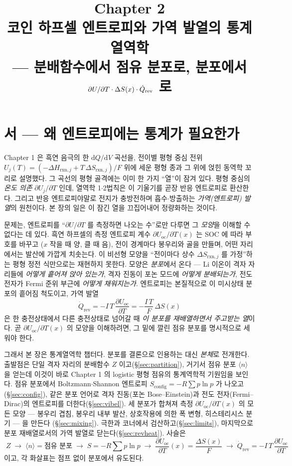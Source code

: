 \documentclass[11pt,a4paper]{article}
\title{\textbf{\LARGE Chapter 2}\\[0.35em]\Large 코인 하프셀 엔트로피와 가역 발열의 통계열역학\\[0.2em]\large — 분배함수에서 점유 분포로, 분포에서 $\partial U/\partial T\cdot\Delta S(x)\cdot\dot Q_\rev$ 로}
\author{}\date{}
\newcommand{\dd}{\mathrm{d}}
\newcommand{\rxn}{\mathrm{rxn}}
\newcommand{\rev}{\mathrm{rev}}
\newcommand{\oc}{\mathrm{oc}}
\newcommand{\config}{\mathrm{config}}
\newcommand{\avg}[1]{\langle #1\rangle}
\begin{document}
\maketitle

\section*{서 — 왜 엔트로피에는 통계가 필요한가}
Chapter 1 은 흑연 음극의 한 $\dd Q/\dd V$ 곡선을, 전이별 평형 중심 전위
$U_j(T)=(-\Delta H_{\rxn,j}+T\,\Delta S_{\rxn,j})/F$ 위에 세운 평형 종과 그 위에 얹힌 동역학 꼬리로
설명했다. 그 곡선의 평형 골격에는 이미 한 가지 ``열''이 잠겨 있다. 평형 중심의 \emph{온도 의존}
$\partial U_j/\partial T$ 인데, 열역학 1$\cdot$2법칙은 이 기울기를 곧장 반응 엔트로피로 환산한다. 그리고
반응 엔트로피야말로 전지가 충방전하며 흡수$\cdot$방출하는 \emph{가역(엔트로피) 발열}의 원천이다. 본 장의
일은 이 잠긴 열을 끄집어내어 정량화하는 것이다.

문제는, 엔트로피를 ``$\partial U/\partial T$ 를 측정하면 나오는 수''로만 다루면 그 \emph{모양}을 이해할 수
없다는 데 있다. 흑연 하프셀의 측정 엔트로피 계수 $\partial U_\oc/\partial T(x)$ 는 SOC 에 따라 부호를 바꾸고
($x$ 작을 때 양, 클 때 음), 전이 경계마다 봉우리와 골을 만들며, 어떤 자리에서는 발산에 가깝게 치솟는다. 이
비선형 모양을 ``전이마다 상수 $\Delta S_{\rxn,j}$ 를 가정''하는 평형 정전 식만으로는 재현하지 못한다. 모양은
\emph{분포}에서 온다 — Li 이온이 격자 자리들에 \emph{어떻게 흩어져 앉아 있는가}, 격자 진동이 포논 모드에
\emph{어떻게 분배되는가}, 전도 전자가 Fermi 준위 부근에 \emph{어떻게 채워지는가}. 엔트로피는 본질적으로
이 미시상태 분포의 흩어짐 척도이고, 가역 발열
\[
\dot Q_\rev=-I\,T\,\frac{\partial U_\oc}{\partial T}=-\frac{I\,T}{F}\,\Delta S(x)
\]
은 한 충전상태에서 다른 충전상태로 넘어갈 때 \emph{이 분포를 재배열하면서 주고받는 열}이다. 곧
$\partial U_\oc/\partial T(x)$ 의 모양을 이해하려면, 그 밑에 깔린 점유 분포를 명시적으로 세워야 한다.

그래서 본 장은 통계열역학 챕터다. 분포를 결론으로 인용하는 대신 \emph{본체}로 전개한다. 출발점은 단일 격자
자리의 분배함수 $Z$ 이고(\S\ref{sec:partition}), 거기서 점유 분포 $\avg{n}$ 을 얻는데 이것이 바로 Chapter 1
의 logistic 평형 점유의 통계역학적 기원임을 보인다. 점유 분포에서 Boltzmann$\cdot$Shannon 엔트로피
$S_\config=-R\sum p\ln p$ 가 나오고(\S\ref{sec:config}), 같은 분포 언어로 격자 진동(포논 Bose--Einstein)과
전도 전자(Fermi--Dirac)의 엔트로피를 더한다(\S\ref{sec:vibel}). 세 분포가 합쳐져 측정 $\partial U_\oc/\partial T(x)$
의 모든 모양 — 봉우리 겹침, 봉우리 내부 발산, 상호작용에 의한 폭 변형, 히스테리시스 분기 — 을 만든다
(\S\ref{sec:mixing}). 극한과 코너에서 검산하고(\S\ref{sec:limits}), 마지막으로 분포 재배열로서의 가역
발열로 닫는다(\S\ref{sec:revheat}). 사슬은
\[
\boxed{\;Z \;\to\; \avg{n}=\text{점유 분포}\;\to\; S=-R\textstyle\sum p\ln p \;\to\; \frac{\partial U_\oc}{\partial T}(x)=\frac{\Delta S(x)}{F}\;\to\;\dot Q_\rev=-I\,T\,\frac{\partial U_\oc}{\partial T}\;}
\]
이고, 각 화살표는 점프 없이 분포에서 유도된다.
\end{document}
